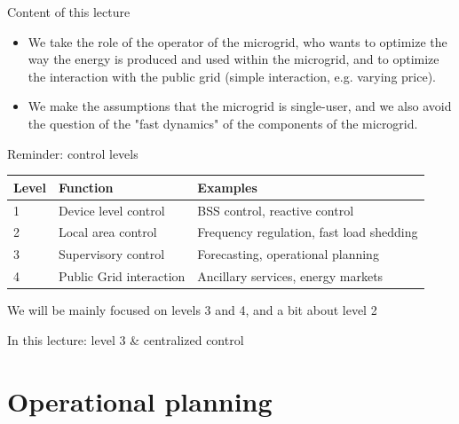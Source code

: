\begin{frame}{Content of this lecture}
\begin{itemize}
  \item We take the role of the operator of the microgrid, who wants to optimize the way the energy is produced and used within the microgrid, and to optimize the interaction with the public grid (simple interaction, e.g. varying price).
  \item We make the assumptions that the microgrid is single-user, and we also avoid the question of the "fast dynamics" of the components of the microgrid.
\end{itemize}

\end{frame} \begin{frame}{Reminder: control levels}
\begin{center}
\begin{tabular}{|l|l|l|}
\hline
Level & Function & Examples \\
\hline
1 & Device level control & BSS control, reactive control \\
\hline
2 & Local area control & Frequency regulation, fast load shedding \\
\hline
3 & Supervisory control & Forecasting, operational planning \\
\hline
4 & Public Grid interaction & Ancillary services, energy markets \\
\hline
\end{tabular}
\end{center}

We will be mainly focused on levels 3 and 4, and a bit about level 2

In this lecture: level 3 \& centralized control
\end{frame} 

\section{Operational planning}

